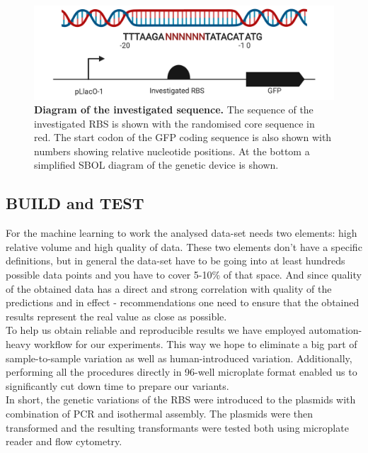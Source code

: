 \documentclass{article}
\begin{document}
\begin{figure}[t]
    \centering
    \includegraphics[scale=0.6]{plots/RBS_anatomy.pdf}
    \caption{\textbf{Diagram of the investigated sequence.} The sequence of the investigated RBS is shown with the randomised core sequence in red. The start codon of the GFP coding sequence is also shown with numbers showing relative nucleotide positions. At the bottom a simplified SBOL diagram of the genetic device is shown.}
    \label{fig: Anatomy of the randomized sequence.}
\end{figure}

\subsection{BUILD and TEST}

For the machine learning to work the analysed data-set needs two elements: high relative volume and high quality of data. These two elements don't have a specific definitions, but in general the data-set have to be going into at least hundreds possible data points and you have to cover 5-10\% of that space. And since quality of the obtained data has a direct and strong correlation with quality of the predictions and in effect - recommendations one need to ensure that the obtained results represent the real value as close as possible.\\
To help us obtain reliable and reproducible results we have employed automation-heavy workflow for our experiments. This way we hope to eliminate a big part of sample-to-sample variation as well as human-introduced variation. Additionally, performing all the procedures directly in 96-well microplate format enabled us to significantly cut down time to prepare our variants.\\
In short, the genetic variations of the RBS were introduced to the plasmids with combination of PCR and isothermal assembly. The plasmids were then transformed and the resulting transformants were tested both using microplate reader and flow cytometry.\\
\end{document}

